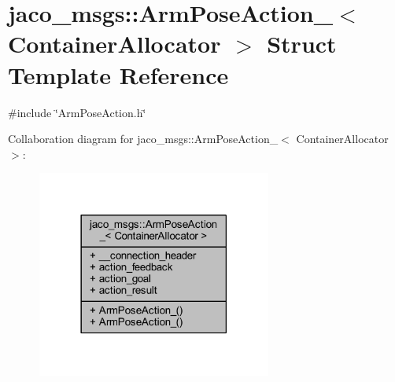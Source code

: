 \hypertarget{structjaco__msgs_1_1ArmPoseAction__}{}\section{jaco\+\_\+msgs\+:\+:Arm\+Pose\+Action\+\_\+$<$ Container\+Allocator $>$ Struct Template Reference}
\label{structjaco__msgs_1_1ArmPoseAction__}


{\ttfamily \#include \char`\"{}Arm\+Pose\+Action.\+h\char`\"{}}



Collaboration diagram for jaco\+\_\+msgs\+:\+:Arm\+Pose\+Action\+\_\+$<$ Container\+Allocator $>$\+:
\nopagebreak
\begin{figure}[H]
\begin{center}
\leavevmode
\includegraphics[width=218pt]{d8/d28/structjaco__msgs_1_1ArmPoseAction____coll__graph}
\end{center}
\end{figure}
